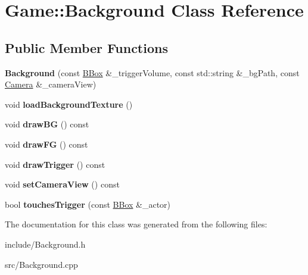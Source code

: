 \hypertarget{classGame_1_1Background}{\section{Game\-:\-:Background Class Reference}
\label{classGame_1_1Background}
}
\subsection*{Public Member Functions}
\begin{DoxyCompactItemize}
\item 
\hypertarget{classGame_1_1Background_acb2afe4a78fe21079e2fb3491e337771}{{\bfseries Background} (const \hyperlink{classGame_1_1BBox}{B\-Box} \&\-\_\-trigger\-Volume, const std\-::string \&\-\_\-bg\-Path, const \hyperlink{classGame_1_1Camera}{Camera} \&\-\_\-camera\-View)}\label{classGame_1_1Background_acb2afe4a78fe21079e2fb3491e337771}

\item 
\hypertarget{classGame_1_1Background_a5efad663cec409424a46961b737ce8d6}{void {\bfseries load\-Background\-Texture} ()}\label{classGame_1_1Background_a5efad663cec409424a46961b737ce8d6}

\item 
\hypertarget{classGame_1_1Background_a91c336faf59b833d58575c89bf770869}{void {\bfseries draw\-B\-G} () const }\label{classGame_1_1Background_a91c336faf59b833d58575c89bf770869}

\item 
\hypertarget{classGame_1_1Background_a19f67365a2e15556a135b553fc492cbf}{void {\bfseries draw\-F\-G} () const }\label{classGame_1_1Background_a19f67365a2e15556a135b553fc492cbf}

\item 
\hypertarget{classGame_1_1Background_a19dc463d5a7db5c76b43aa64c14b605b}{void {\bfseries draw\-Trigger} () const }\label{classGame_1_1Background_a19dc463d5a7db5c76b43aa64c14b605b}

\item 
\hypertarget{classGame_1_1Background_af933e24ec36d15c80259159afaa4652b}{void {\bfseries set\-Camera\-View} () const }\label{classGame_1_1Background_af933e24ec36d15c80259159afaa4652b}

\item 
\hypertarget{classGame_1_1Background_aaf71717b73df461a65fede5fdaa58949}{bool {\bfseries touches\-Trigger} (const \hyperlink{classGame_1_1BBox}{B\-Box} \&\-\_\-actor)}\label{classGame_1_1Background_aaf71717b73df461a65fede5fdaa58949}

\end{DoxyCompactItemize}


The documentation for this class was generated from the following files\-:\begin{DoxyCompactItemize}
\item 
include/Background.\-h\item 
src/Background.\-cpp\end{DoxyCompactItemize}
